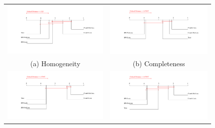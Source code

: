 \begin{landscape}
\begin{figure}[h]
\centering
  \begin{tabular}{@{}cc@{}}
    \hspace{-1cm}\includegraphics*[scale=0.5]{./imgs/chap_4/Homogeneity}&
    \includegraphics*[scale=0.5]{./imgs/chap_4/Completeness} \\
    \scriptsize{(a) Homogeneity}& \scriptsize{(b) Completeness}\\
    \hspace{-1cm}\includegraphics*[scale=0.5]{./imgs/chap_4/V-Measure}&
    \includegraphics*[scale=0.5]{./imgs/chap_4/Adj_Mutual_info} \\

\end{tabular}
\end{figure}
\end{landscape}
